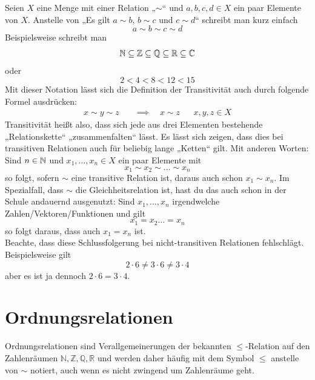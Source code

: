 \begin{bem} \label{kettenfalten}
 Seien $X$ eine Menge mit einer Relation „$\sim$“ und $a,b,c,d\in X$ ein paar Elemente von $X$. Anstelle von „Es gilt $a\sim b$, $b\sim c$ und $c\sim d$“ schreibt man kurz einfach
 \[ a\sim b\sim c\sim d \]
 Beispielsweise schreibt man
 \[ {\mathbb N} \subseteq {\mathbb Z}\subseteq{\mathbb Q}\subseteq{\mathbb R}\subseteq {\mathbb C} \]
 oder
 \[ 2 < 4 < 8 < 12 < 15 \]
 Mit dieser Notation lässt sich die Definition der Transitivität auch durch folgende Formel ausdrücken:
 \begin{align*}
  x\sim y \sim z \quad&\implies\quad x\sim z && x,y,z\in X
 \end{align*}
Transitivität heißt also, dass sich jede aus drei Elementen bestehende „Relationskette“ „zusammenfalten“ lässt. Es lässt sich zeigen, dass dies bei transitiven Relationen auch für beliebig lange „Ketten“ gilt. Mit anderen Worten: Sind $n\in {\mathbb N}$ und $x_1,\dots , x_n\in X$ ein paar Elemente mit
\[ x_1 \sim x_2\sim \ldots \sim x_n \]
so folgt, sofern ${\sim}$ eine transitive Relation ist, daraus auch schon $x_1\sim x_n$. Im Spezialfall, dass $\sim$ die Gleichheitsrelation ist, hast du das auch schon in der Schule andauernd ausgenutzt: Sind $x_1,\dots , x_n$ irgendwelche Zahlen/Vektoren/Funktionen und gilt
\[ x_1=x_2\ldots = x_n \]
so folgt daraus, dass auch $x_1=x_n$ ist. \\[0.5em] 
 Beachte, dass diese Schlussfolgerung bei nicht-transitiven Relationen fehlschlägt. Beispielsweise gilt
 \[ 2\cdot 6 \neq 3\cdot 6\neq 3\cdot 4 \]
 aber es ist ja dennoch $2\cdot 6=3\cdot 4$.
\end{bem}

\section{Ordnungsrelationen}

Ordnungsrelationen sind Verallgemeinerungen der bekannten \glqq$\leq$\grqq-Relation auf den Zahlenräumen $\mathbb{N},\mathbb{Z},\mathbb{Q},\mathbb{R}$ und werden daher häufig mit dem Symbol $\leq$ anstelle von $\sim$ notiert, auch wenn es nicht zwingend um Zahlenräume geht.

